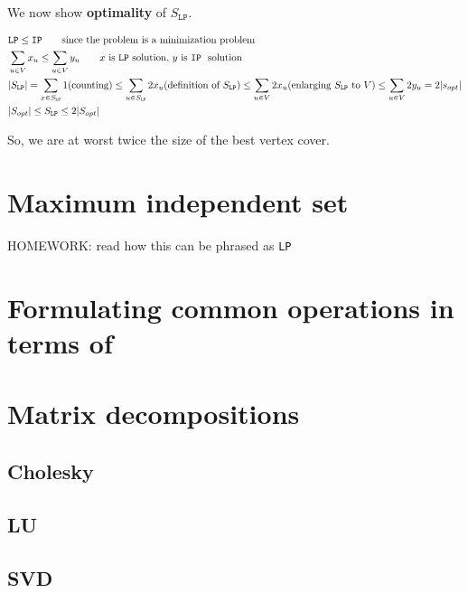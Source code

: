 \documentclass[11pt]{book}
\newcommand{\ip}{\texttt{IP} }
\newcommand{\lp}{\texttt{LP}}
\begin{document}
We now show \textbf{optimality} of $S_\lp$.

\begin{align*}
    &\lp \leq \ip \qquad \text{since the problem is a minimization problem} \\
    &\sum_{u \in V} x_u \leq \sum_{u \in V} y_u \qquad \text{$x$ is \lp~solution, $y$ is \ip~solution} \\
    &|S_\lp| = \sum_{x \in S_\lp} 1 \text{(counting})\leq 
    \sum_{u\in S_\lp} 2 x_u  \text{(definition of $S_\lp$)} \leq
    \sum_{u \in V} 2 x_u \text{(enlarging $S_\lp$ to $V$)} \leq
        \sum_{u \in V} 2 y_u = 2|s_{opt}| \\
    &|S_{opt}| \leq S_\lp \leq 2 |S_{opt}|
\end{align*}

So, we are at worst twice the size of the best vertex cover.

\section{Maximum independent set}
HOMEWORK: read how this can be phrased as \lp

\section{Formulating common operations in terms of \ilp}

\section{Matrix decompositions}
\subsection{Cholesky}
\subsection{LU}
\subsection{SVD}
\end{document}
